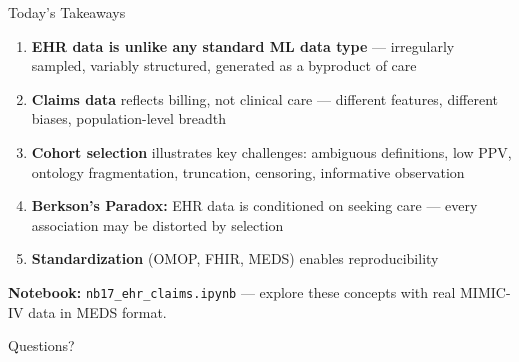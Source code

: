 \documentclass[aspectratio=169,10pt]{beamer}
\begin{document}
\begin{frame}{Today's Takeaways}
\begin{enumerate}
    \item \textbf{EHR data is unlike any standard ML data type} --- irregularly sampled, variably structured, generated as a byproduct of care
    \item \textbf{Claims data} reflects billing, not clinical care --- different features, different biases, population-level breadth
    \item \textbf{Cohort selection} illustrates key challenges: ambiguous definitions, low PPV, ontology fragmentation, truncation, censoring, informative observation
    \item \textbf{Berkson's Paradox:} EHR data is conditioned on seeking care --- every association may be distorted by selection
    \item \textbf{Standardization} (OMOP, FHIR, MEDS) enables reproducibility
\end{enumerate}
\vspace{0.3em}
\textbf{Notebook:} \texttt{nb17\_ehr\_claims.ipynb} --- explore these concepts with real MIMIC-IV data in MEDS format.
\end{frame}
\begin{frame}[standout]
    Questions?
\end{frame}

\appendix



\appendix


\appendix
\end{document}
